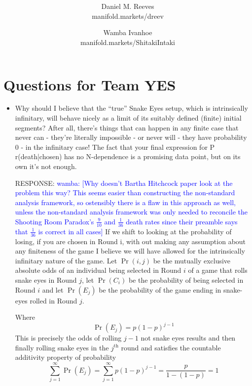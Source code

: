 \documentclass[article,twocolumn]{memoir}
\title{\HUGE\textbf{\longtitle}\\ \textbf{\shorttitle}}
\author{Daniel M. Reeves\\manifold.markets/dreev
\and
Wamba Ivanhoe\\manifold.markets/ShitakiIntaki
}
\date{\protect\tstamp} %
\newcommand{\wamba} [1]{\ifnum\Chatty=1 \textcolor{blue}{wamba:  [#1]} \fi}
\begin{document}
\pagestyle{headings}
\maketitle


\chapter*{Questions for Team YES}
\begin{itemize}
    \item Why should I believe that the “true” Snake Eyes setup, which is intrinsically infinitary, will behave nicely as a limit of its suitably defined (finite) initial segments? After all, there’s things that can happen in any finite case that never can - they’re literally impossible - or never will - they have probability 0 - in the infinitary case! The fact that your final expression for P r(death|chosen) has no N-dependence is a promising data point, but on its own it’s not enough.

    {\color{violet} 
        RESPONSE: 
        \wamba{Why doesn't Bartha Hitchcock paper look at the problem this way? This seems easier than constructing the non-standard analysis framework, so ostensibly there is a flaw in this approach as well, unless the non-standard analysis framework was only needed to reconcile the Shooting Room Paradox's $\frac{9}{10}$ and $\frac{1}{36}$ death rates since their preamble says that $\frac{1}{36}$ is correct in all cases}
        If we shift to looking at the probability of losing, if you are chosen in Round i, with out making any assumption about any finiteness of the game I believe we will have allowed for the intrinsically infinitary nature of the game.
        Let $\Pr(i,j)$ be the mutually exclusive absolute odds of an individual being selected in Round $i$ of a game that rolls snake eyes in Round $j$, let $\Pr(C_i)$ be the probability of being selected in Round $i$ and let $\Pr(E_j)$ be the probability of the game ending in snake-eyes rolled in Round $j$.

        Where
        $$\Pr(E_j) = p(1-p)^{j-1}$$
        This is precisely the odds of rolling $j-1$ not snake eyes results and then finally rolling snake eyes in the $j^\text{th}$ round and satisfies the countable additivity property of probability 
        $$\sum_{j=1}^\infty \Pr(E_j) =\sum_{j=1}^\infty p(1-p)^{j-1}= \frac{p}{1-(1-p)}=1$$
        
}
\end{itemize}
\end{document}
